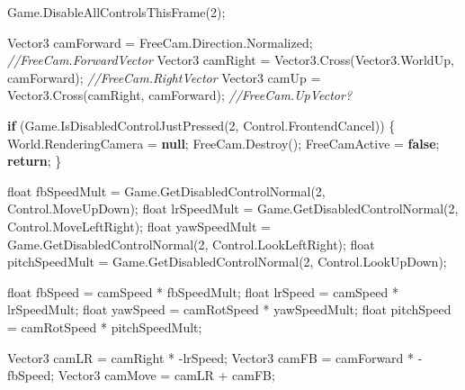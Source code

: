 \documentclass[
  openany]{book}
\newenvironment{Shaded}{\begin{snugshade}}{\end{snugshade}}
\newcommand{\CommentTok}[1]{\textcolor[rgb]{0.56,0.35,0.01}{\textit{#1}}}
\newcommand{\DataTypeTok}[1]{\textcolor[rgb]{0.13,0.29,0.53}{#1}}
\newcommand{\DecValTok}[1]{\textcolor[rgb]{0.00,0.00,0.81}{#1}}
\newcommand{\FunctionTok}[1]{\textcolor[rgb]{0.00,0.00,0.00}{#1}}
\newcommand{\KeywordTok}[1]{\textcolor[rgb]{0.13,0.29,0.53}{\textbf{#1}}}
\newcommand{\NormalTok}[1]{#1}
\begin{document}
\begin{Shaded}
\begin{Highlighting}[]
\NormalTok{            Game.}\FunctionTok{DisableAllControlsThisFrame}\NormalTok{(}\DecValTok{2}\NormalTok{);}

\NormalTok{            Vector3 camForward = FreeCam.}\FunctionTok{Direction}\NormalTok{.}\FunctionTok{Normalized}\NormalTok{; }\CommentTok{//FreeCam.ForwardVector}
\NormalTok{            Vector3 camRight = Vector3.}\FunctionTok{Cross}\NormalTok{(Vector3.}\FunctionTok{WorldUp}\NormalTok{, camForward); }\CommentTok{//FreeCam.RightVector}
\NormalTok{            Vector3 camUp = Vector3.}\FunctionTok{Cross}\NormalTok{(camRight, camForward); }\CommentTok{//FreeCam.UpVector?}

                \KeywordTok{if}\NormalTok{ (Game.}\FunctionTok{IsDisabledControlJustPressed}\NormalTok{(}\DecValTok{2}\NormalTok{, Control.}\FunctionTok{FrontendCancel}\NormalTok{))}
\NormalTok{            \{}
\NormalTok{                World.}\FunctionTok{RenderingCamera}\NormalTok{ = }\KeywordTok{null}\NormalTok{;}
\NormalTok{                FreeCam.}\FunctionTok{Destroy}\NormalTok{();}
\NormalTok{                FreeCamActive = }\KeywordTok{false}\NormalTok{;}
                \KeywordTok{return}\NormalTok{;}
\NormalTok{            \}}

            \DataTypeTok{float}\NormalTok{ fbSpeedMult = Game.}\FunctionTok{GetDisabledControlNormal}\NormalTok{(}\DecValTok{2}\NormalTok{, Control.}\FunctionTok{MoveUpDown}\NormalTok{);}
            \DataTypeTok{float}\NormalTok{ lrSpeedMult = Game.}\FunctionTok{GetDisabledControlNormal}\NormalTok{(}\DecValTok{2}\NormalTok{, Control.}\FunctionTok{MoveLeftRight}\NormalTok{);}
            \DataTypeTok{float}\NormalTok{ yawSpeedMult = Game.}\FunctionTok{GetDisabledControlNormal}\NormalTok{(}\DecValTok{2}\NormalTok{, Control.}\FunctionTok{LookLeftRight}\NormalTok{);}
            \DataTypeTok{float}\NormalTok{ pitchSpeedMult = Game.}\FunctionTok{GetDisabledControlNormal}\NormalTok{(}\DecValTok{2}\NormalTok{, Control.}\FunctionTok{LookUpDown}\NormalTok{);}

            \DataTypeTok{float}\NormalTok{ fbSpeed = camSpeed * fbSpeedMult;}
            \DataTypeTok{float}\NormalTok{ lrSpeed = camSpeed * lrSpeedMult;}
            \DataTypeTok{float}\NormalTok{ yawSpeed = camRotSpeed * yawSpeedMult;}
            \DataTypeTok{float}\NormalTok{ pitchSpeed = camRotSpeed * pitchSpeedMult;}

\NormalTok{            Vector3 camLR = camRight * -lrSpeed;}
\NormalTok{            Vector3 camFB = camForward * -fbSpeed;}
\NormalTok{            Vector3 camMove = camLR + camFB;}


\end{Highlighting}
\end{Shaded}
\end{document}
